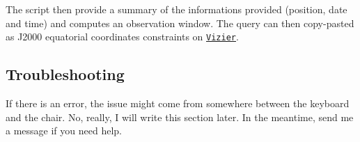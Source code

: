 \documentclass[10pt, a4paper]{article} %
\begin{document}
The script then provide a summary of the informations provided (position, date and time) and computes an observation window. The query can then copy-pasted as J2000 equatorial coordinates constraints on \texttt{\href{https://vizier.cds.unistra.fr/}{Vizier}}.

\subsection{Troubleshooting}

If there is an error, the issue might come from somewhere between the keyboard and the chair. No, really, I will write this section later. In the meantime, send me a message if you need help.
\end{document}
